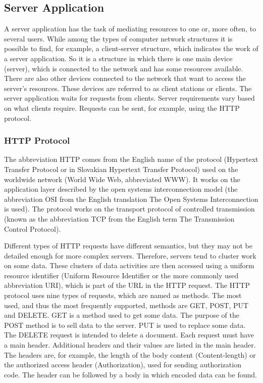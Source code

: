 \documentclass[
  language=english,
  figures=false,
  sourcecodes,
  index
]{kidiplom}
\begin{document}
\subsection{Server Application}
A server application has the task of mediating resources to one or, more often, to several users. While among the types of computer network structures it is possible to find, for example, a client-server structure, which indicates the work of a server application. So it is a structure in which there is one main device (server), which is connected to the network and has some resources available. There are also other devices connected to the network that want to access the server's resources. These devices are referred to as client stations or clients. The server application waits for requests from clients. Server requirements vary based on what clients require. Requests can be sent, for example, using the HTTP protocol.

\subsubsection{HTTP Protocol}
The abbreviation HTTP comes from the English name of the protocol (Hypertext Transfer Protocol or in Slovakian Hypertext Transfer Protocol) used on the worldwide network (World Wide Web, abbreviated WWW). It works on the application layer described by the open systems interconnection model (the abbreviation OSI from the English translation The Open Systems Interconnection is used)\cite{bib1}. The protocol works on the transport protocol of controlled transmission (known as the abbreviation TCP from the English term The Transmission Control Protocol).

Different types of HTTP requests have different semantics, but they may not be detailed enough for more complex servers. Therefore, servers tend to cluster work on some data. These clusters of data activities are then accessed using a uniform resource identifier (Uniform Resource Identifier or the more commonly used abbreviation URI), which is part of the URL in the HTTP request. The HTTP protocol uses nine types of requests, which are named as methods. The most used, and thus the most frequently supported, methods are GET, POST, PUT and DELETE. GET is a method used to get some data. The purpose of the POST method is to sell data to the server. PUT is used to replace some data. The DELETE request is intended to delete a document.
Each request must have a main header. Additional headers and their values are listed in the main header. The headers are, for example, the length of the body content (Content-length) or the authorized access header (Authorization), used for sending authorization code. The header can be followed by a body in which encoded data can be found.
\end{document}
